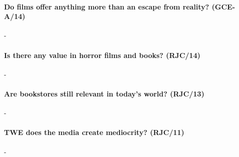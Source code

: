 \documentclass[../../main]{subfiles}
\begin{document}
\paragraph{Do films offer anything more than an escape from reality? (GCE-A/14)} -

\paragraph{Is there any value in horror films and books? (RJC/14)}-

\paragraph{Are bookstores still relevant in today's world? (RJC/13)}-

\paragraph{TWE does the media create mediocrity? (RJC/11)}-
\end{document}
